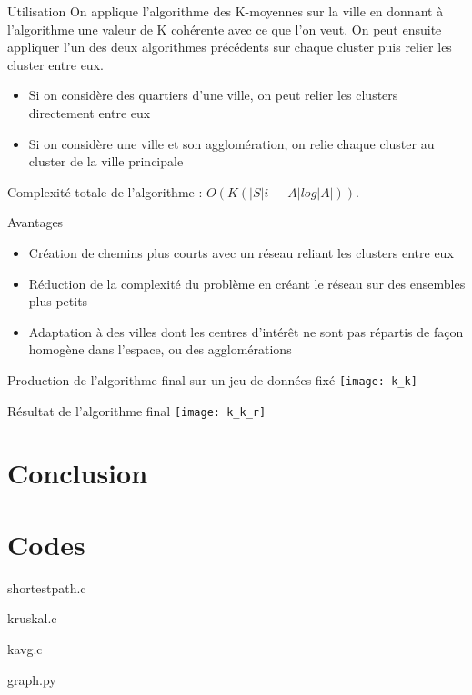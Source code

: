 \documentclass[aspectratio=43,11pt]{beamer}
\begin{document}
\begin{frame}{Utilisation}
    On applique l'algorithme des K-moyennes sur la ville en donnant à l'algorithme une valeur de K cohérente avec ce que l'on veut.
    On peut ensuite appliquer l'un des deux algorithmes précédents sur chaque cluster puis relier les cluster entre eux.
    \begin{itemize}
        \item Si on considère des quartiers d'une ville, on peut relier les clusters directement entre eux
        \item Si on considère une ville et son agglomération, on relie chaque cluster au cluster de la ville principale
    \end{itemize}
    Complexité totale de l'algorithme : $O(K (|S| i + |A| log |A|))$.
\end{frame}
\begin{frame}{Avantages}
    \begin{itemize}
        \item Création de chemins plus courts avec un réseau reliant les clusters entre eux
        \item Réduction de la complexité du problème en créant le réseau sur des ensembles plus petits
        \item Adaptation à des villes dont les centres d'intérêt ne sont pas répartis de façon homogène dans l'espace, ou des agglomérations
    \end{itemize}
\end{frame}
\begin{frame}{Production de l'algorithme final sur un jeu de données fixé}
    \centering
        \texttt{[image: k\_k]}
\end{frame}
\begin{frame}{Résultat de l'algorithme final}
    \centering
        \texttt{[image: k\_k\_r]}
\end{frame}
\section{Conclusion}
\UseRawInputEncoding
\section{Codes}
\begin{frame}[allowframebreaks]{shortestpath.c}
     
\end{frame}
\begin{frame}[allowframebreaks]{kruskal.c}
     
\end{frame}
\begin{frame}[allowframebreaks]{kavg.c}
     
\end{frame}
\begin{frame}[allowframebreaks]{graph.py}
     
\end{frame}
\end{document}
